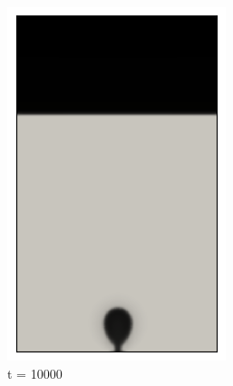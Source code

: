 \begin{figure}[H]
\begin{subfigure}{0.25\textwidth}
		\includegraphics[width=\linewidth]{figs/cap4/bb_760_d10}
		\caption{t = 10000}
		\label{fig:2}
	\end{subfigure}\hfil 
	\begin{subfigure}{0.25\textwidth}

\end{subfigure}
\end{figure}
